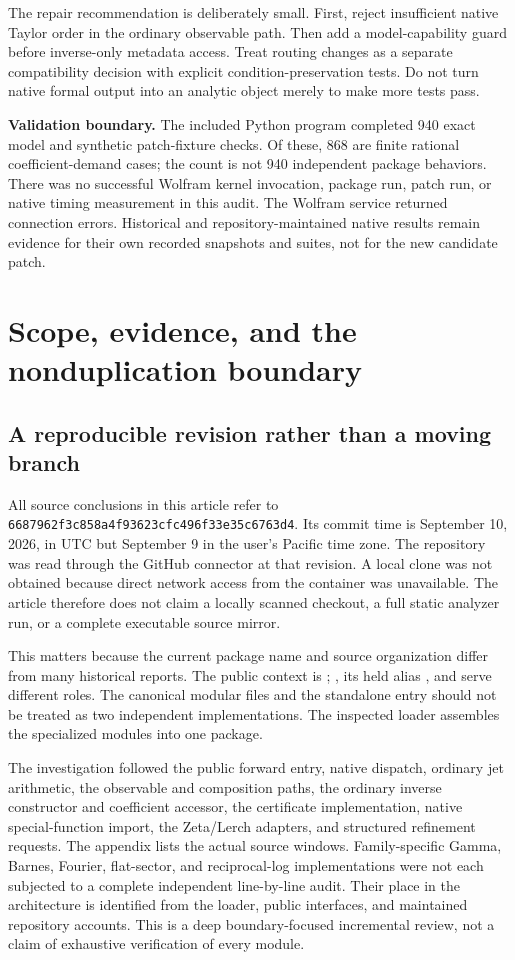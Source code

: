 \documentclass[11pt,letterpaper]{article}
\newcommand{\rev}{\texttt{6687962f3c858a4f93623cfc496f33e35c6763d4}}
\theoremstyle{definition}\newtheorem{definition}[proposition]{Definition}
\begin{document}
The repair recommendation is deliberately small. First, reject insufficient
native Taylor order in the ordinary observable path. Then add a model-capability
guard before inverse-only metadata access. Treat routing changes as a separate
compatibility decision with explicit condition-preservation tests. Do not turn
native formal output into an analytic object merely to make more tests pass.

\textbf{Validation boundary.} The included Python program completed 940 exact
model and synthetic patch-fixture checks. Of these, 868 are finite rational
coefficient-demand cases; the count is not 940 independent package behaviors.
There was no successful Wolfram kernel invocation, package run, patch run, or
native timing measurement in this audit. The Wolfram service returned connection
errors. Historical and repository-maintained native results remain evidence
for their own recorded snapshots and suites, not for the new candidate patch.

\newpage
\tableofcontents
\newpage

\section{Scope, evidence, and the nonduplication boundary}
\subsection{A reproducible revision rather than a moving branch}
All source conclusions in this article refer to \rev. Its commit time is
September 10, 2026, in UTC but September 9 in the user's Pacific time zone.
The repository was read through the GitHub connector at that revision. A local
clone was not obtained because direct network access from the container was
unavailable. The article therefore does not claim a locally scanned checkout,
a full static analyzer run, or a complete executable source mirror.\cite{commit}

This matters because the current package name and source organization differ
from many historical reports. The public context is ;
, its held alias , and
 serve different roles. The canonical modular files
and the standalone entry should not be treated as two independent
implementations. The inspected loader assembles the specialized modules into
one package.\cite{core,native}

The investigation followed the public forward entry, native dispatch, ordinary
jet arithmetic, the observable and composition paths, the ordinary inverse
constructor and coefficient accessor, the certificate implementation, native
special-function import, the Zeta/Lerch adapters, and structured refinement
requests. The appendix lists the actual source windows. Family-specific
Gamma, Barnes, Fourier, flat-sector, and reciprocal-log implementations were
not each subjected to a complete independent line-by-line audit. Their place
in the architecture is identified from the loader, public interfaces, and
maintained repository accounts. This is a deep boundary-focused incremental
review, not a claim of exhaustive verification of every module.
\end{document}
